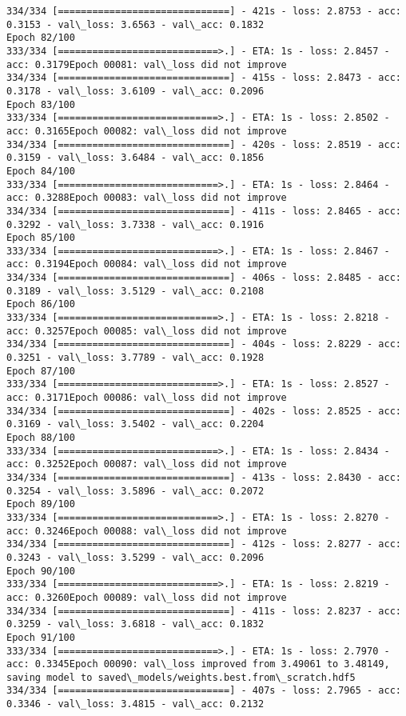 \documentclass[11pt]{article}
\begin{document}
\begin{Verbatim}[commandchars=\\\{\}]
334/334 [==============================] - 421s - loss: 2.8753 - acc: 0.3153 - val\_loss: 3.6563 - val\_acc: 0.1832
Epoch 82/100
333/334 [============================>.] - ETA: 1s - loss: 2.8457 - acc: 0.3179Epoch 00081: val\_loss did not improve
334/334 [==============================] - 415s - loss: 2.8473 - acc: 0.3178 - val\_loss: 3.6109 - val\_acc: 0.2096
Epoch 83/100
333/334 [============================>.] - ETA: 1s - loss: 2.8502 - acc: 0.3165Epoch 00082: val\_loss did not improve
334/334 [==============================] - 420s - loss: 2.8519 - acc: 0.3159 - val\_loss: 3.6484 - val\_acc: 0.1856
Epoch 84/100
333/334 [============================>.] - ETA: 1s - loss: 2.8464 - acc: 0.3288Epoch 00083: val\_loss did not improve
334/334 [==============================] - 411s - loss: 2.8465 - acc: 0.3292 - val\_loss: 3.7338 - val\_acc: 0.1916
Epoch 85/100
333/334 [============================>.] - ETA: 1s - loss: 2.8467 - acc: 0.3194Epoch 00084: val\_loss did not improve
334/334 [==============================] - 406s - loss: 2.8485 - acc: 0.3189 - val\_loss: 3.5129 - val\_acc: 0.2108
Epoch 86/100
333/334 [============================>.] - ETA: 1s - loss: 2.8218 - acc: 0.3257Epoch 00085: val\_loss did not improve
334/334 [==============================] - 404s - loss: 2.8229 - acc: 0.3251 - val\_loss: 3.7789 - val\_acc: 0.1928
Epoch 87/100
333/334 [============================>.] - ETA: 1s - loss: 2.8527 - acc: 0.3171Epoch 00086: val\_loss did not improve
334/334 [==============================] - 402s - loss: 2.8525 - acc: 0.3169 - val\_loss: 3.5402 - val\_acc: 0.2204
Epoch 88/100
333/334 [============================>.] - ETA: 1s - loss: 2.8434 - acc: 0.3252Epoch 00087: val\_loss did not improve
334/334 [==============================] - 413s - loss: 2.8430 - acc: 0.3254 - val\_loss: 3.5896 - val\_acc: 0.2072
Epoch 89/100
333/334 [============================>.] - ETA: 1s - loss: 2.8270 - acc: 0.3246Epoch 00088: val\_loss did not improve
334/334 [==============================] - 412s - loss: 2.8277 - acc: 0.3243 - val\_loss: 3.5299 - val\_acc: 0.2096
Epoch 90/100
333/334 [============================>.] - ETA: 1s - loss: 2.8219 - acc: 0.3260Epoch 00089: val\_loss did not improve
334/334 [==============================] - 411s - loss: 2.8237 - acc: 0.3259 - val\_loss: 3.6818 - val\_acc: 0.1832
Epoch 91/100
333/334 [============================>.] - ETA: 1s - loss: 2.7970 - acc: 0.3345Epoch 00090: val\_loss improved from 3.49061 to 3.48149, saving model to saved\_models/weights.best.from\_scratch.hdf5
334/334 [==============================] - 407s - loss: 2.7965 - acc: 0.3346 - val\_loss: 3.4815 - val\_acc: 0.2132

\end{Verbatim}
\end{document}

